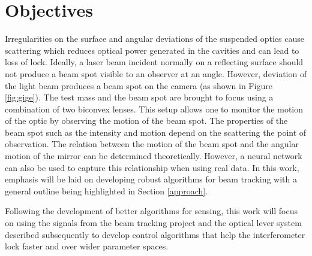 \documentclass[colorlinks=true,pdfstartview=FitV,linkcolor=blue,
            citecolor=red,urlcolor=magenta]{ligodoc}
\newcommand{\G}[1]{\textcolor{JungleGreen}{#1}} %
\begin{document}



\section{Objectives}\label{objectives}

    Irregularities on the surface and angular deviations of the suspended optics cause scattering which reduces optical power generated in the cavities and can lead to loss of lock. Ideally, a laser beam incident normally on a reflecting surface should not produce a beam spot visible to an observer at an angle. However, deviation of the light beam produces a beam spot on the camera (as shown in Figure \ref{fig:gige}). The test mass and the beam spot are brought to focus using a combination of two biconvex lenses. This setup allows one to monitor the motion of the optic by observing the motion of the beam spot. The properties of the beam spot such as the intensity and motion depend on the scattering the point of observation. The relation between the motion of the beam spot and the angular motion of the mirror can be determined theoretically. However, a neural network can also be used to capture this relationship when using real data. In this work, emphasis will be laid on developing robust algorithms for beam tracking with a general outline being highlighted in Section \ref{approach}.
   

    Following the development of better algorithms for sensing, this work will focus on using the signals from the beam tracking project and the optical lever system described subsequently to develop control algorithms that help the interferometer lock faster and over wider parameter spaces.
\end{document}

